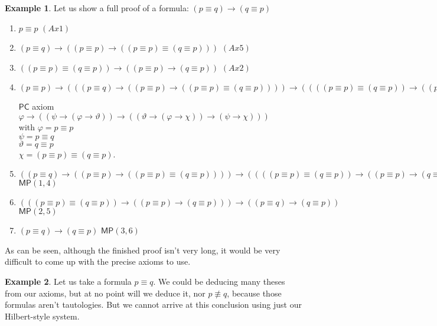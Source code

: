 \documentclass{article}
\theoremstyle{definition}
\theoremstyle{definition}
\newtheorem{example}{Example}[section]
\theoremstyle{definition}
\newcommand*{\id}{\equiv}
\newcommand*{\ra}{\rightarrow}
\newcommand{\PC}{$\mathsf{PC}$\xspace}
\newcommand{\MP}{\mathsf{MP}}
\begin{document}
\begin{example}
    \label{ex_pqqp}
    Let us show a full proof of a formula: $(p \id q) \ra (q \id p)$

    \begin{enumerate}
        \item $p \id p$ \hfill $(Ax1)$
        \item $(p \id q) \ra ((p \id p) \ra ((p \id p) \id (q \id p)))$ \hfill $(Ax5)$
        \item $((p \id p) \id (q \id p)) \ra ((p \id p) \ra (q \id p))$ \hfill $(Ax2)$
        \item $(p \id p) \ra (((p \id q) \ra ((p \id p) \ra ((p \id p) \id (q \id p)))) \ra ((((p \id p) \id (q \id p)) \ra ((p \id p) \ra (q \id p))) \ra ((p \id q) \ra (q \id p))))$
              \begin{flushright}
                  \PC axiom $\varphi \ra ((\psi \ra (\varphi \ra \vartheta)) \ra ((\vartheta \ra (\varphi \ra \chi)) \ra (\psi \ra \chi)))$
                  \\
                  with $\varphi = p \id p$\\$\psi = p \id q$\\$\vartheta = q \id p$\\$\chi = (p \id p) \id (q \id p)$.
              \end{flushright}
        \item $((p \id q) \ra ((p \id p) \ra ((p \id p) \id (q \id p)))) \ra ((((p \id p) \id (q \id p)) \ra ((p \id p) \ra (q \id p))) \ra ((p \id q) \ra (q \id p)))$ \hfill $\MP(1, 4)$
        \item $(((p \id p) \id (q \id p)) \ra ((p \id p) \ra (q \id p))) \ra ((p \id q) \ra (q \id p))$ \hfill $\MP(2, 5)$
        \item $(p \id q) \ra (q \id p)$ \hfill $\MP(3, 6)$
    \end{enumerate}

\end{example}
%
As can be seen, although the finished proof isn't very long, it would be very
difficult to come up with the precise axioms to use.

\begin{example}
    Let us take a formula $p \id q$. We could be deducing many theses from our axioms, but at no point will we deduce it, nor $p \not \id q$, because those formulas aren't tautologies. But we cannot arrive at this conclusion using just our Hilbert-style system.
\end{example}
\end{document}
